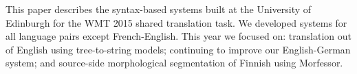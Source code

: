 This paper describes the syntax-based systems built at the University of Edinburgh for the WMT 2015 shared translation task. We developed systems for all language pairs except French-English. This year we focused on: translation out of English using tree-to-string models; continuing to improve our English-German system; and source-side morphological segmentation of Finnish using Morfessor.
